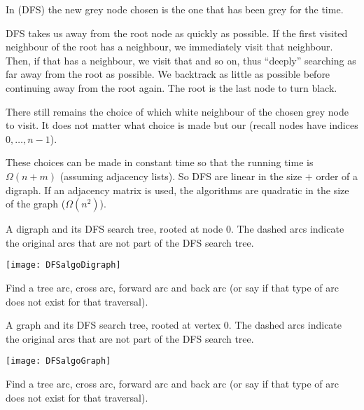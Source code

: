 \begin{Definition}
In  (DFS) the new grey node chosen is the one
that has been grey for the  time.
\end{Definition}
 


DFS takes us away from the root node as quickly as possible. If the first visited neighbour of the root has a neighbour, we immediately visit that neighbour. 
Then, if that has a neighbour, we visit that and so on, thus ``deeply'' searching as far away from the root as possible. 
We backtrack as little as possible before continuing away from the root again. The root is the last node to turn black.

There still remains the choice of which white neighbour of the chosen grey node to visit. 
It does not matter what choice is made but our  (recall nodes have indices $0, \dots, n - 1$). 

These choices can be made in constant time so that the running time is  $\Omega(n + m)$ (assuming adjacency lists). 
So DFS are linear in the size $+$ order of a digraph. 
If an adjacency matrix is used, the algorithms are quadratic in the size of the graph ($\Omega(n^2)$).

\begin{Boxample}[2]
A digraph and its DFS search tree, rooted at node $0$. The dashed arcs indicate the original arcs that are not part of the DFS search tree.
\begin{center}
\texttt{[image: DFSalgoDigraph]}
\end{center}
Find a tree arc, cross arc, forward arc and back arc (or say if that type of arc does not exist for that traversal).
\end{Boxample}


\begin{Boxample}[2]
A graph and its DFS search tree, rooted at vertex $0$. The dashed arcs indicate the original arcs that are not part of the DFS search tree.
\begin{center}
\texttt{[image: DFSalgoGraph]} 
\end{center}
Find a tree arc, cross arc, forward arc and back arc (or say if that type of arc does not exist for that traversal).
\end{Boxample}

